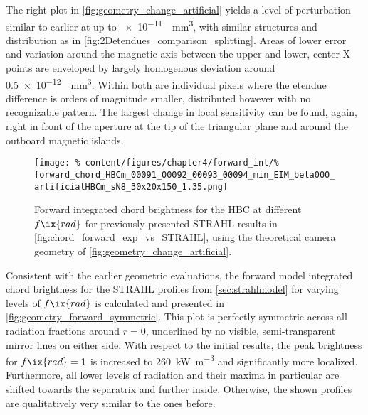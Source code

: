                 The right plot in \cref{fig:geometry_change_artificial} yields a level of perturbation similar to earlier at up to \SI[per-mode=reciprocal]{e-11}{\per\cubic\milli\meter}, with similar structures and distribution as in \cref{fig:2Detendues_comparison_splitting}. Areas of lower error and variation around the magnetic axis between the upper and lower, center X-points are enveloped by largely homogenous deviation around \SI[per-mode=reciprocal]{0.5e-12}{\per\cubic\milli\meter}. Within both are individual pixels where the etendue difference is orders of magnitude smaller, distributed however with no recognizable pattern. The largest change in local sensitivity can be found, again, right in front of the aperture at the tip of the triangular plane and around the outboard magnetic islands.\\%
%
            \begin{figure}[t]%
                \centering%
                \texttt{[image: \%
                    content/figures/chapter4/forward\_int/\%
                    forward\_chord\_HBCm\_00091\_00092\_00093\_00094\_min\_EIM\_beta000\_artificialHBCm\_sN8\_30x20x150\_1.35.png]}%
                \caption{Forward integrated chord brightness for the HBC at different $f\ix{rad}$ for previously presented STRAHL results in \cref{fig:chord_forward_exp_vs_STRAHL}, using the theoretical camera geometry of \cref{fig:geometry_change_artificial}.}\label{fig:forward_intSTRAHL_artificial}%
            \end{figure}%
%
            Consistent with the earlier geometric evaluations, the forward model integrated chord brightness for the STRAHL profiles from \cref{sec:strahlmodel} for varying levels of $f\ix{rad}$ is calculated and presented in \cref{fig:geometry_forward_symmetric}. This plot is perfectly symmetric across all radiation fractions around $r=0$, underlined by no visible, semi-transparent mirror lines on either side. With respect to the initial results, the peak brightness for $f\ix{rad}=1$ is increased to \SI{260}{\kilo\watt\per\cubic\meter} and significantly more localized. Furthermore, all lower levels of radiation and their maxima in particular are shifted towards the separatrix and further inside. Otherwise, the shown profiles are qualitatively very similar to the ones before.\\%
%
